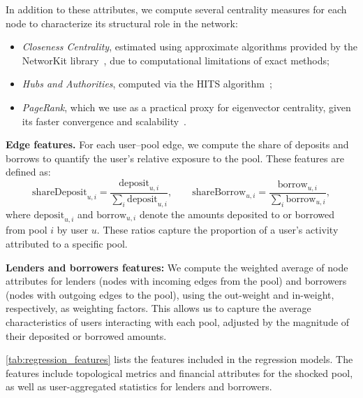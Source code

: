 \documentclass[a4paper,UKenglish,cleveref, autoref, thm-restate]{informs3}
\begin{document}
In addition to these attributes, we compute several centrality measures for each node to characterize its structural role in the network:
\begin{itemize}
    \item \emph{Closeness Centrality}, estimated using approximate algorithms provided by the NetworKit library~\citep{angriman2023algorithms}, due to computational limitations of exact methods;
    \item \emph{Hubs and Authorities}, computed via the HITS algorithm~\citep{kleinberg1999authoritative};
    \item \emph{PageRank}, which we use as a practical proxy for eigenvector centrality, given its faster convergence and scalability~\citep{page1999pagerank}.
\end{itemize}

\textbf{Edge features.} For each user–pool edge, we compute the share of deposits and borrows to quantify the user’s relative exposure to the pool. These features are defined as:
\begin{equation}
\text{shareDeposit}_{u,i} = \frac{\text{deposit}_{u,i}}{\sum_{i} \text{deposit}_{u,i}}, \qquad
\text{shareBorrow}_{u,i} = \frac{\text{borrow}_{u,i}}{\sum_{i} \text{borrow}_{u,i}},
\end{equation}
\noindent where $\text{deposit}_{u,i}$ and $\text{borrow}_{u,i}$ denote the amounts deposited to or borrowed from pool $i$ by user $u$. These ratios capture the proportion of a user's activity attributed to a specific pool.


\textbf{Lenders and borrowers features:} We compute the weighted average of node attributes for lenders (nodes with incoming edges from the pool) and borrowers (nodes with outgoing edges to the pool), using the out-weight and in-weight, respectively, as weighting factors. This allows us to capture the average characteristics of users interacting with each pool, adjusted by the magnitude of their deposited or borrowed amounts.

\autoref{tab:regression_features} lists the features included in the regression models. 
The features include topological metrics and financial attributes for the shocked pool, as well as user-aggregated statistics for lenders and borrowers. 
\end{document}
